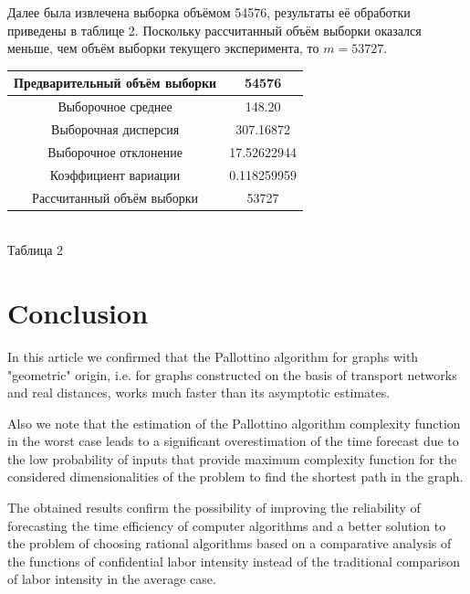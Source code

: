 \documentclass[a4paper]{article}
\begin{document}
Далее была извлечена выборка объёмом 54576, результаты её обработки приведены в таблице 2. Поскольку рассчитанный объём выборки оказался меньше, чем объём выборки текущего эксперимента, то $m = 53727$.

\hfill \break

\begin{center}
	\label{table2}
\begin{tabular}{|c|c|}
	\hline
	Предварительный объём выборки & 54576 \\
	\hline
	Выборочное среднее & 148.20 \\
	\hline
	Выборочная дисперсия & 307.16872 \\
	\hline
	Выборочное отклонение & 17.52622944 \\
	\hline
	Коэффициент вариации & 0.118259959 \\
	\hline
	Рассчитанный объём выборки & 53727 \\
	\hline
\end{tabular} \\
	\hfill \break
	Таблица 2
\end{center}

\section{Conclusion} \label{sec:conclusion}
In this article we confirmed that the Pallottino algorithm for graphs with "geometric" origin, i.e. for graphs constructed on the basis of transport networks and real distances, works much faster than its asymptotic estimates.

Also we note that the estimation of the Pallottino algorithm complexity function in the worst case leads to a significant overestimation of the time forecast due to the low probability of inputs that provide maximum complexity function for the considered dimensionalities of the problem to find the shortest path in the graph.

The obtained results confirm the possibility of improving the reliability of forecasting the time efficiency of computer algorithms and a better solution to the problem of choosing rational algorithms based on a comparative analysis of the functions of confidential labor intensity instead of the traditional comparison of labor intensity in the average case.
\end{document}
